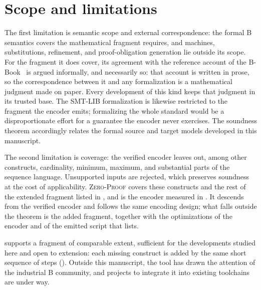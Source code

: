 \section{Scope and limitations}
\label{sec:limitations}

The first limitation is semantic scope and external correspondence: the formal
B semantics covers the mathematical fragment \beer{} requires, and machines,
substitutions, refinement, and proof-obligation generation lie outside
its scope. For the fragment it does
cover, its agreement with the reference account of the
B-Book~\cite{abrial1996bbook} is argued informally, and necessarily so: that
account is written in prose, so the correspondence between it and any
formalization is a mathematical judgment made on paper. Every development of
this kind keeps that judgment in its trusted base. The SMT-LIB formalization is
likewise restricted to the fragment the encoder emits; formalizing the whole
standard would be a disproportionate effort for a guarantee the encoder never
exercises. The soundness theorem accordingly relates the formal source and
target models developed in this manuscript.

The second limitation is coverage: the verified \beer{} encoder leaves out, among
other constructs, cardinality, minimum, maximum, and substantial parts of the
sequence language. Unsupported inputs are rejected, which preserves soundness at
the cost of applicability. \textsc{Zero-Proof} \beer{} covers these constructs
and the rest of the extended fragment listed in , and
is the encoder measured in . It descends from the verified
encoder and follows the same encoding design; what falls outside the theorem is
the added fragment, together with the optimizations of the encoder and of the
emitted script that  lists.

\barrel{} supports a fragment of comparable extent, sufficient for the
developments studied here and open to extension: each missing construct is added
by the same short sequence of steps (). Outside
this manuscript, the tool has drawn the attention of the industrial B community,
and projects to integrate it into existing toolchains are under way.